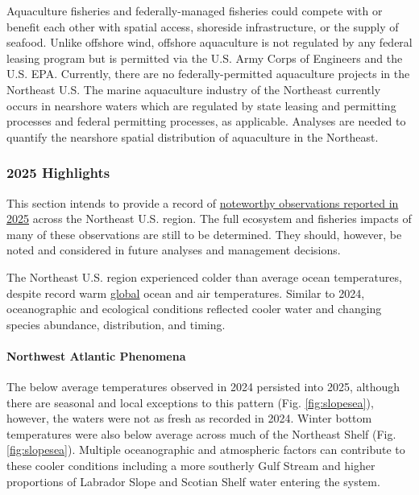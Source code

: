 \documentclass[
  10pt,
]{article}
\begin{document}
Aquaculture fisheries and federally-managed fisheries could compete with or benefit each other with spatial access, shoreside infrastructure, or the supply of seafood. Unlike offshore wind, offshore aquaculture is not regulated by any federal leasing program but is permitted via the U.S. Army Corps of Engineers and the U.S. EPA. Currently, there are no federally-permitted aquaculture projects in the Northeast U.S. The marine aquaculture industry of the Northeast currently occurs in nearshore waters which are regulated by state leasing and permitting processes and federal permitting processes, as applicable. Analyses are needed to quantify the nearshore spatial distribution of aquaculture in the Northeast.

\newpage

\subsubsection{2025 Highlights}\label{highlights}

This section intends to provide a record of \href{https://noaa-edab.github.io/catalog/observation_synthesis_2025.html}{noteworthy observations reported in 2025} across the Northeast U.S. region. The full ecosystem and fisheries impacts of many of these observations are still to be determined. They should, however, be noted and considered in future analyses and management decisions.

The Northeast U.S. region experienced colder than average ocean temperatures, despite record warm \href{https://www.ncei.noaa.gov/news/global-climate-202513}{global} ocean and air temperatures. Similar to 2024, oceanographic and ecological conditions reflected cooler water and changing species abundance, distribution, and timing.

\paragraph{Northwest Atlantic Phenomena}\label{northwest-atlantic-phenomena}

The below average temperatures observed in 2024 persisted into 2025, although there are seasonal and local exceptions to this pattern (Fig. \ref{fig:slopesea}), however, the waters were not as fresh as recorded in 2024. Winter bottom temperatures were also below average across much of the Northeast Shelf (Fig. \ref{fig:slopesea}). Multiple oceanographic and atmospheric factors can contribute to these cooler conditions including a more southerly Gulf Stream and higher proportions of Labrador Slope and Scotian Shelf water entering the system.
\end{document}
